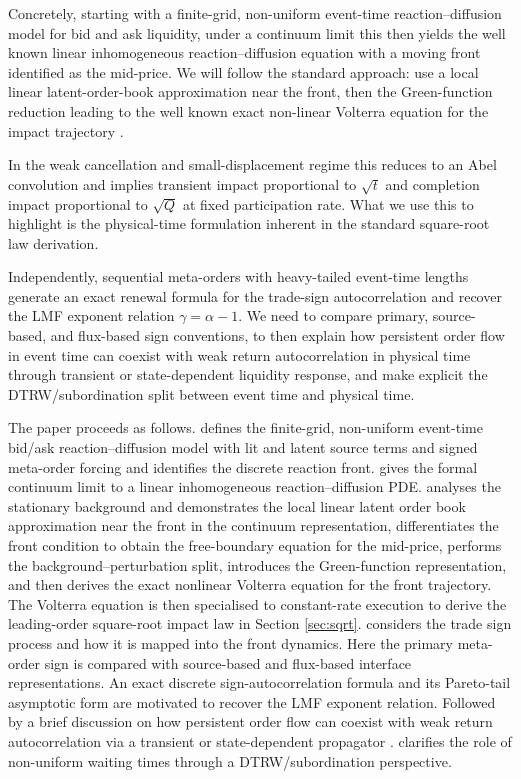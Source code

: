 \documentclass[5p,final]{elsarticle}
\begin{document}
Concretely, starting with a finite-grid, non-uniform event-time reaction--diffusion model for bid and ask liquidity, under a continuum limit this then yields the well known linear inhomogeneous reaction--diffusion equation with a moving front identified as the mid-price. We will follow the standard approach: use a local linear latent-order-book approximation near the front, then the Green-function reduction leading to the well known exact non-linear Volterra equation for the impact trajectory \cite{toth2011anomalous, donier2015fully, bouchaud2018tqp}. 

In the weak cancellation and small-displacement regime this reduces to an Abel convolution and implies transient impact proportional to $\sqrt{t}$ and completion impact proportional to $\sqrt{Q}$ at fixed participation rate. What we use this to highlight is the physical-time formulation inherent in the standard square-root law derivation. 

Independently, sequential meta-orders with heavy-tailed event-time lengths generate an exact renewal formula for the trade-sign autocorrelation and recover the LMF exponent relation $\gamma=\alpha-1$. We need to compare primary, source-based, and flux-based sign conventions, to then explain how persistent order flow in event time can coexist with weak return autocorrelation in physical time through transient or state-dependent liquidity response, and make explicit the DTRW/subordination split between event time and physical time. 

The paper proceeds as follows.  defines the finite-grid, non-uniform event-time bid/ask reaction--diffusion model with lit and latent source terms and signed meta-order forcing and identifies the discrete reaction front.  gives the formal continuum limit to a linear inhomogeneous reaction--diffusion PDE.  analyses the stationary background and demonstrates the local linear latent order book approximation near the front in the continuum representation, differentiates the front condition to obtain the free-boundary equation for the mid-price, performs the background--perturbation split, introduces the Green-function representation, and then derives the exact nonlinear Volterra equation for the front trajectory. The Volterra equation is then specialised to constant-rate execution to derive the leading-order square-root impact law in Section \ref{sec:sqrt}.  considers the trade sign process and how it is mapped into the front dynamics. Here the primary meta-order sign is compared with source-based and flux-based interface representations. An exact discrete sign-autocorrelation formula and its Pareto-tail asymptotic form are motivated to recover the LMF exponent relation. Followed by a brief discussion on how persistent order flow can coexist with weak return autocorrelation via a transient or state-dependent propagator \cite{bouchaud2018tqp}.  clarifies the role of non-uniform waiting times through a DTRW/subordination perspective. 
\end{document}
